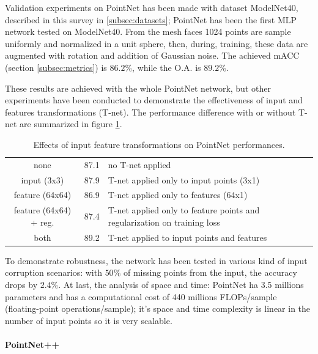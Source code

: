Validation experiments on PointNet has been made with dataset ModelNet40, described in this survey in \ref{subsec:datasets}; PointNet has been the first MLP network tested on ModelNet40. From the mesh faces 1024 points are sample uniformly and normalized in a unit sphere, then, during, training, these data are augmented with rotation and addition of Gaussian noise. The achieved mACC (section \ref{subsec:metrics}) is $86.2 \%$, while the O.A. is $89.2 \%$.

These results are achieved with the whole PointNet network, but other experiments have been conducted to demonstrate the effectiveness of input and features transformations (T-net). The performance difference with or without T-net are summarized in figure \ref{tab:t_net_accuracies}.

\begin{table}[ht]
    \centering
    \begin{tabular}{cc|l}
        \hline \text { \textbf{Transform} } & \text { \textbf{Accuracy} (\%) } & \text {\textbf{Description} }\\
        \hline none & 87.1 & no T-net applied \\
        \hline input (3x3) & 87.9 & T-net applied only to input points (3x1)\\
        feature (64x64)  & 86.9 & T-net applied only to features (64x1)\\
        feature (64x64) + reg. & 87.4 & T-net applied only to feature points and regularization on training loss\\
        \hline
        both & 89.2 & T-net applied to input points and features \\
        \hline
    \end{tabular}
    \caption{Effects of input feature transformations on PointNet performances.}
    \label{tab:t_net_accuracies}
\end{table}

To demonstrate robustness, the network has been tested in various kind of input corruption scenarios: with $50 \%$ of missing points from the input, the accuracy drops by $2.4 \%$. At last, the analysis of space and time: PointNet ha 3.5 millions parameters and has a computational cost of 440 millions FLOPs/sample (floating-point operations/sample); it's space and time complexity is linear in the number of input points so it is very scalable.

\paragraph{PointNet++}
\label{par:pointnet++}

